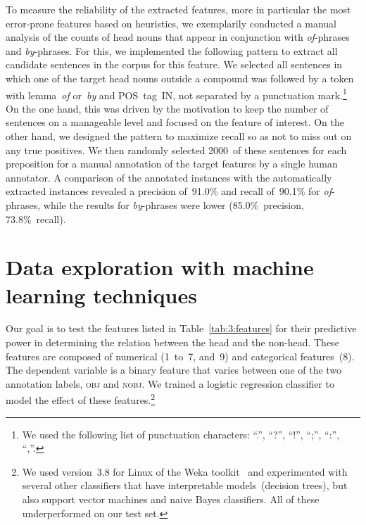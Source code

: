 \documentclass[output=paper]{langsci/langscibook}
\begin{document}
To measure the reliability of the extracted features,  {more in particular the most error-prone features based on heuristics,} we exemplarily conducted a manual analysis of the counts of head nouns that appear in conjunction with \textit{of}-phrases and \textit{by}-phrases. For this, we implemented the following pattern to extract all candidate sentences in the corpus for this feature. We selected all sentences in which one of the target head nouns outside a compound was followed by a token with lemma~\textit{of} or~\textit{by} and POS~tag~IN, not separated by a punctuation mark.\footnote{We used the following list of punctuation characters: ``.'', ``?'', ``!'', ``;'', ``:'', ``,''.} On the one hand, this was driven by the motivation to keep the number of sentences on a manageable level and focused on the feature of interest.
On the other hand, we designed the pattern to maximize recall so as not to miss out on any true positives. We then randomly selected 2000~of these sentences for each preposition for a manual annotation of the target features by a single human annotator. A comparison of the annotated instances with the automatically extracted instances revealed a precision of~91.0\% 
 and recall of~90.1\%  
  for \textit{of}-phrases, while the results for \textit{by}-phrases were lower (85.0\%~precision, 
73.8\%~recall).



\section{Data exploration with machine learning techniques}\label{sec:ML}

Our goal is to test the features listed in Table~\ref{tab:3:features}  for their predictive power in determining the relation between the head and the non-head. These features are composed of numerical (1~to~7, and~9) and categorical features~(8).
The dependent variable is a  {binary} feature that varies between one of the two annotation labels, \textsc{obj} and \textsc{nobj}. We trained a logistic regression classifier to model the effect of these features.\footnote{We used version~3.8 for Linux of the Weka toolkit~\citep{Weka:09} and experimented with several other classifiers that have interpretable models~(decision trees), but also support vector machines and naive Bayes  {classifiers}. All of these underperformed on our test set.} 
\end{document}
